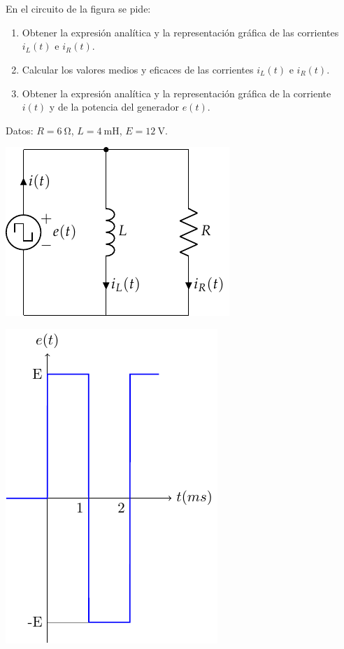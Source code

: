 \documentclass[10pt]{article}
\begin{document}
\clearpage

\section{}


En el circuito de la figura se pide:

\begin{enumerate}
\item Obtener la expresión analítica y la representación gráfica de las corrientes $i_L(t)$ e $i_R(t)$.
\item Calcular los valores medios y eficaces de las corrientes $i_L(t)$ e $i_R(t)$.
\item Obtener la expresión analítica y la representación gráfica de la corriente $i(t)$ y de la potencia del generador $e(t)$.
\end{enumerate}

Datos: $R = \SI{6}{\ohm}$, $L = \SI{4}{\milli\henry}$, $E = \SI{12}{\volt}$.

\begin{minipage}[c]{0.5\linewidth}
  \includegraphics{figs/formas_onda2.pdf}
\end{minipage}
\begin{minipage}[c]{0.5\linewidth}
  \includegraphics{figs/tren_pulsos2.pdf}
\end{minipage}
\end{document}
